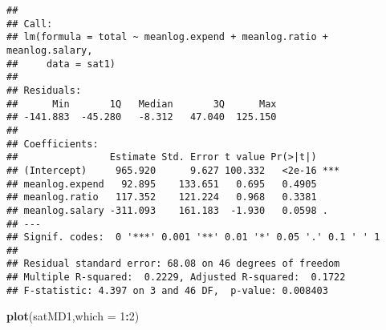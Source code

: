 \documentclass[]{article}
\newenvironment{Shaded}{\begin{snugshade}}{\end{snugshade}}
\newcommand{\DataTypeTok}[1]{\textcolor[rgb]{0.13,0.29,0.53}{#1}}
\newcommand{\DecValTok}[1]{\textcolor[rgb]{0.00,0.00,0.81}{#1}}
\newcommand{\KeywordTok}[1]{\textcolor[rgb]{0.13,0.29,0.53}{\textbf{#1}}}
\newcommand{\NormalTok}[1]{#1}
\newcommand{\OperatorTok}[1]{\textcolor[rgb]{0.81,0.36,0.00}{\textbf{#1}}}
\newcommand{\StringTok}[1]{\textcolor[rgb]{0.31,0.60,0.02}{#1}}
\begin{document}
\begin{Shaded}
\end{Shaded}

\begin{verbatim}
## 
## Call:
## lm(formula = total ~ meanlog.expend + meanlog.ratio + meanlog.salary, 
##     data = sat1)
## 
## Residuals:
##      Min       1Q   Median       3Q      Max 
## -141.883  -45.280   -8.312   47.040  125.150 
## 
## Coefficients:
##                Estimate Std. Error t value Pr(>|t|)    
## (Intercept)     965.920      9.627 100.332   <2e-16 ***
## meanlog.expend   92.895    133.651   0.695   0.4905    
## meanlog.ratio   117.352    121.224   0.968   0.3381    
## meanlog.salary -311.093    161.183  -1.930   0.0598 .  
## ---
## Signif. codes:  0 '***' 0.001 '**' 0.01 '*' 0.05 '.' 0.1 ' ' 1
## 
## Residual standard error: 68.08 on 46 degrees of freedom
## Multiple R-squared:  0.2229, Adjusted R-squared:  0.1722 
## F-statistic: 4.397 on 3 and 46 DF,  p-value: 0.008403
\end{verbatim}

\begin{Shaded}
\begin{Highlighting}[]
\KeywordTok{plot}\NormalTok{(satMD1,}\DataTypeTok{which =} \DecValTok{1}\OperatorTok{:}\DecValTok{2}\NormalTok{)}
\end{Highlighting}
\end{Shaded}
\end{document}
